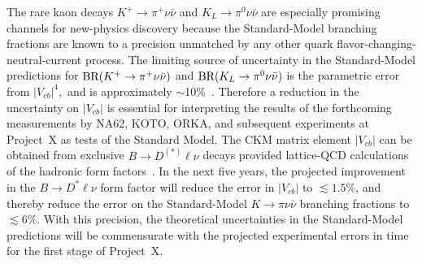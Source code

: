 \begin{itemize}
The rare kaon decays $K^+ \to \pi^+ \nu \bar{\nu}$ and $K_L \to \pi^0 \nu \bar{\nu}$ are especially promising channels for new-physics discovery because the Standard-Model branching fractions are known to a precision unmatched by any other quark flavor-changing-neutral-current process.  The limiting source of uncertainty in the Standard-Model predictions for $\mbox{\rm BR}(K^+ \to \pi^+ \nu \bar{\nu})$ and $\mbox{\rm BR}(K_L \to \pi^0 \nu \bar{\nu})$ is the parametric error from $|V_{cb}|^4,$ and is approximately $\sim$10\%~\cite{Brod:2010hi}.  Therefore a reduction in the uncertainty on $|V_{cb}|$ is essential for interpreting the results of the forthcoming measurements by NA62, KOTO, ORKA, and subsequent experiments at Project~X as tests of the Standard Model.  The CKM matrix element $|V_{cb}|$ can be obtained from exclusive $B \to D^{(*)} \ell\nu$ decays provided
lattice-QCD calculations of the hadronic form factors~\cite{Bailey:2010gb}.  In the next five years, the projected improvement in the $B\to D^* \ell\nu$ form factor will reduce the error in $|V_{cb}|$ to
$\lesssim 1.5\%$, and thereby reduce the error on the Standard-Model $K\to\pi\nu\bar{\nu}$ branching
fractions to $\lesssim 6$\%.  With this precision, the theoretical uncertainties in the Standard-Model predictions will be commensurate
with the projected experimental errors in time for the first stage of Project~X.


\end{itemize}
